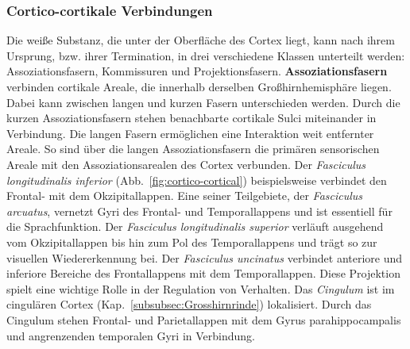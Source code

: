 \documentclass[12pt,a4paper,pdftex]{article}
\begin{document}
\subsubsection*{Cortico-cortikale Verbindungen}
\label{subsubsec:cortico-cortical}

Die weiße Substanz, die unter der Oberfläche des Cortex liegt, kann nach ihrem Ursprung, bzw. ihrer Termination, in drei verschiedene Klassen unterteilt werden: Assoziationsfasern, Kommissuren und Projektionsfasern.
\textbf{Assoziationsfasern} verbinden cortikale Areale, die innerhalb derselben Großhirnhemisphäre liegen. Dabei kann zwischen langen und kurzen Fasern unterschieden werden. Durch die kurzen Assoziationsfasern stehen benachbarte cortikale Sulci miteinander in Verbindung. Die langen Fasern ermöglichen eine Interaktion weit entfernter Areale. So sind über die langen Assoziationsfasern die primären sensorischen Areale mit den Assoziationsarealen des Cortex verbunden. Der \textit{Fasciculus longitudinalis inferior} (Abb.~\ref{fig:cortico-cortical}) beispielsweise verbindet den Frontal- mit dem Okzipitallappen. Eine seiner Teilgebiete, der \textit{Fasciculus arcuatus}, vernetzt Gyri des Frontal- und Temporallappens und ist essentiell für die Sprachfunktion. Der \textit{Fasciculus longitudinalis superior} verläuft ausgehend vom Okzipitallappen bis hin zum Pol des Temporallappens und trägt so zur visuellen Wiedererkennung bei. Der \textit{Fasciculus uncinatus} verbindet anteriore und inferiore Bereiche des Frontallappens mit dem Temporallappen. Diese Projektion spielt eine wichtige Rolle in der Regulation von Verhalten. Das \textit{Cingulum} ist im cingulären Cortex (Kap.~\ref{subsubsec:Grosshirnrinde}) lokalisiert. Durch das Cingulum stehen Frontal- und Parietallappen mit dem Gyrus parahippocampalis und angrenzenden temporalen Gyri in Verbindung.
\end{document}
